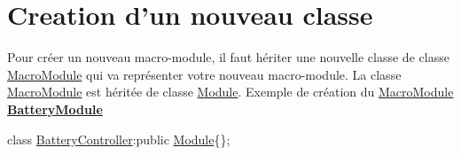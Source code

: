 \hypertarget{docModule_classCreation}{}\section{Creation d'un nouveau classe}\label{docModule_classCreation}
Pour créer un nouveau macro-\/module, il faut hériter une nouvelle classe de classe \hyperlink{classMacroModule}{Macro\-Module} qui va représenter votre nouveau macro-\/module. La classe \hyperlink{classMacroModule}{Macro\-Module} est héritée de classe \hyperlink{classModule}{Module}. Exemple de création du \hyperlink{classMacroModule}{Macro\-Module} {\bfseries \hyperlink{classBatteryModule}{Battery\-Module}}

{\ttfamily class \hyperlink{classBatteryController}{Battery\-Controller}\-:public \hyperlink{classModule}{Module}\{\};}


